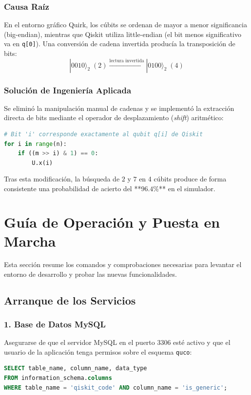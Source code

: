 \documentclass[11pt,a4paper]{article}
\begin{document}
\subsubsection{Causa Raíz}
En el entorno gráfico Quirk, los cúbits se ordenan de mayor a menor significancia (big-endian), mientras que Qiskit utiliza little-endian (el bit menos significativo va en \texttt{q[0]}). Una conversión de cadena invertida producía la transposición de bits:
\begin{equation}
    |0010\rangle_2 \; (2) \xrightarrow{\text{lectura invertida}} |0100\rangle_2 \; (4)
\end{equation}

\subsubsection{Solución de Ingeniería Aplicada}
Se eliminó la manipulación manual de cadenas y se implementó la extracción directa de bits mediante el operador de desplazamiento (\textit{shift}) aritmético:
\begin{lstlisting}[language=Python, caption={Extraccion directa de bits sin riesgo de inversion}]
# Bit 'i' corresponde exactamente al qubit q[i] de Qiskit
for i in range(n):
    if ((m >> i) & 1) == 0:
        U.x(i)
\end{lstlisting}
Tras esta modificación, la búsqueda de $2$ y $7$ en 4 cúbits produce de forma consistente una probabilidad de acierto del **$96.4\%$** en el simulador.

\section{Guía de Operación y Puesta en Marcha}

Esta sección resume los comandos y comprobaciones necesarias para levantar el entorno de desarrollo y probar las nuevas funcionalidades.

\subsection{Arranque de los Servicios}

\subsubsection{1. Base de Datos MySQL}
Asegurarse de que el servidor MySQL en el puerto 3306 esté activo y que el usuario de la aplicación tenga permisos sobre el esquema \texttt{quco}:
\begin{lstlisting}[language=SQL]
SELECT table_name, column_name, data_type 
FROM information_schema.columns 
WHERE table_name = 'qiskit_code' AND column_name = 'is_generic';
\end{lstlisting}
\end{document}
